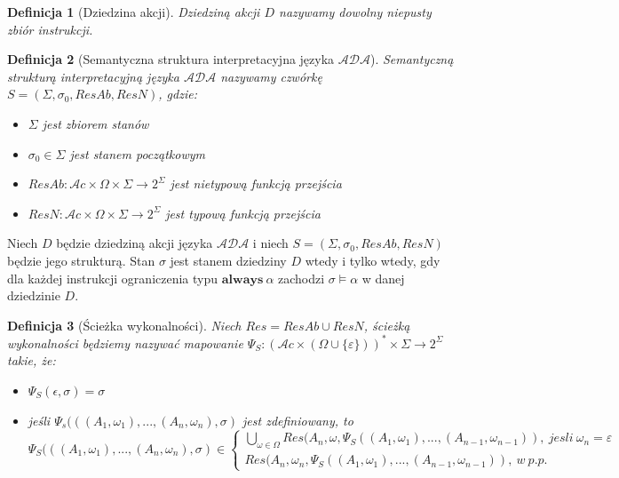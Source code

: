 \documentclass[11pt,a4paper]{article}
\newtheorem{definition}{Definicja}[section]
\begin{document}
    \begin{definition}[Dziedzina akcji]
    Dziedziną akcji $D$ nazywamy dowolny niepusty zbiór instrukcji.
    \end{definition}
    
    \begin{definition}[Semantyczna struktura interpretacyjna języka $\mathcal{ADA}$]
    Semantyczną strukturą interpretacyjną języka $\mathcal{ADA}$ nazywamy czwórkę $S=(\Sigma, \sigma_0, ResAb, ResN)$, gdzie:
    \begin{itemize}
        \item $\Sigma$ jest zbiorem stanów
        \item $\sigma_0 \in \Sigma$ jest stanem początkowym
        \item $ResAb: \mathcal{A}c \times \Omega \times \Sigma \rightarrow 2^\Sigma$ jest nietypową funkcją przejścia
        \item $ResN: \mathcal{A}c \times \Omega \times \Sigma \rightarrow 2^\Sigma$ jest typową funkcją przejścia
    \end{itemize}
    \end{definition}
    
    Niech $D$ będzie dziedziną akcji języka $\mathcal{ADA}$ i niech $S=(\Sigma, \sigma_0, ResAb, ResN)$ będzie jego strukturą. Stan $\sigma$ jest stanem dziedziny $D$ wtedy i tylko wtedy, gdy dla każdej instrukcji ograniczenia typu $\mathbf{always}~\alpha$ zachodzi $\sigma \models \alpha$ w danej dziedzinie $D$.
    
    \begin{definition}[Ścieżka wykonalności]
    Niech $Res = ResAb \cup ResN$, ścieżką wykonalności będziemy nazywać mapowanie $\Psi_S: (\mathcal{A}c \times (\Omega \cup \{ \varepsilon \}))^* \times \Sigma \rightarrow 2^\Sigma$ takie, że:
    \begin{itemize}
        \item $\Psi_S(\epsilon, \sigma) = \sigma$
        \item jeśli $\Psi_s(((A_1, \omega_1), ..., (A_n, \omega_n), \sigma)$ jest zdefiniowany, to    
    \[
    \Psi_S(((A_1, \omega_1), ..., (A_n, \omega_n), \sigma) \in \left \{
        \begin{array}{ll}
             \bigcup\limits_{\omega \in \Omega} Res(A_n, \omega, \Psi_S((A_1, \omega_1), ..., (A_{n-1}, \omega_{n-1})),~jesli~\omega_n = \varepsilon\\
             Res(A_n, \omega_n, \Psi_S((A_1, \omega_1), ..., (A_{n-1}, \omega_{n-1})),~w~p.p.
         \end{array}
     \right.
    \]
    \end{itemize}
    \end{definition}
    
\end{document}

